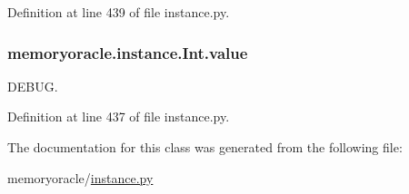 Definition at line 439 of file instance.\+py.

\hypertarget{classmemoryoracle_1_1instance_1_1Int_a1aa7dad36f0713d9c4775562cd74efc8}{}
\subsubsection[{value}]{\setlength{\rightskip}{0pt plus 5cm}memoryoracle.\+instance.\+Int.\+value}\label{classmemoryoracle_1_1instance_1_1Int_a1aa7dad36f0713d9c4775562cd74efc8}


D\+E\+B\+U\+G. 



Definition at line 437 of file instance.\+py.



The documentation for this class was generated from the following file\+:\begin{DoxyCompactItemize}
\item 
memoryoracle/\hyperlink{instance_8py}{instance.\+py}\end{DoxyCompactItemize}
